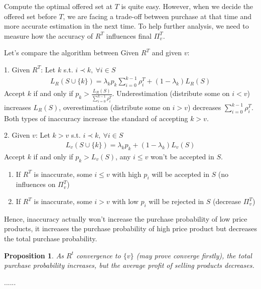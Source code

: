 \documentclass[11pt,a4paper]{article}
\newtheorem{proposition}{Proposition}
\begin{document}
Compute the optimal offered set at $T$ is quite easy. However, when we decide the offered set before $T$, we are facing a trade-off between purchase at that time and more accurate estimation in the next time. To help further analysis, we need to measure how the accuracy of $R^T$ influences final $\Pi_v^T$.

Let's compare the algorithm between Given $R^T$ and given $v$:

1. Given $R^T$: Let $k$ s.t. $i\prec k,\ \forall i\in S$
\begin{equation}
    \begin{aligned}
        L_R(S\cup\{k\})=\lambda_kp_k\sum_{i=0}^{k-1} \rho_i^T+(1-\lambda_k)L_R(S)
    \end{aligned}
    \nonumber
\end{equation}
Accept $k$ if and only if $p_k>\frac{L_R(S)}{\sum_{i=0}^{k-1} \rho_i^T}$. Underestimation (distribute some on $i < v$) increases $L_R(S)$, overestimation (distribute some on $i > v$) decreases $\sum_{i=0}^{k-1} \rho_i^T$. Both types of inaccuracy increase the standard of accepting $k>v$.

2. Given $v$: Let $k>v$ s.t. $i\prec k,\ \forall i\in S$
\begin{equation}
    \begin{aligned}
        L_v(S\cup\{k\})=\lambda_kp_k+(1-\lambda_k)L_v(S)
    \end{aligned}
    \nonumber
\end{equation}
Accept $k$ if and only if $p_k>L_v(S)$, any $i\leq v$ won't be accepted in $S$.
\begin{enumerate}[(1)]
    \item If $R^T$ is inaccurate, some $i\leq v$ with high $p_i$ will be accepted in $S$ (no influences on $\Pi_v^T$)
    \item If $R^T$ is inaccurate, some $i> v$ with low $p_i$ will be rejected in $S$ (decrease $\Pi_v^T$)
\end{enumerate}
Hence, inaccuracy actually won't increase the purchase probability of low price products, it increases the purchase probability of high price product but decreases the total purchase probability.

\begin{proposition}
    As $R^t$ convergence to $\{v\}$ (may prove converge firstly), the total purchase probability increases, but the average profit of selling products decreases.
\end{proposition}




......
\end{document}
